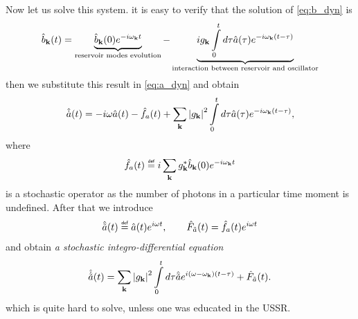 Now let us solve this system. it is easy to verify that the solution of  \eqref{eq:b_dyn}  is
\begin{equation}
	\hat{b}_{\mathbf{k}}(t) = \underbrace{\hat{b}_{\mathbf{k}}(0) e^{-i\omega_{\mathbf{k}} t}}_{\text{reservoir modes evolution}} - \underbrace{i g_{\mathbf{k}} \int \limits_0^{t} d\tau \hat{a}(\tau) e^{-i\omega_{\mathbf{k}}(t - \tau)}}_{\text{interaction between reservoir and oscillator}}
\end{equation}
then we substitute this result in \eqref{eq:a_dyn} and obtain
\begin{equation}
	\hat{\dot{a}}(t) = - i \omega \hat{a}(t) - \hat{f}_a(t) + \sum_{\mathbf{k}} \left| g_{\mathbf{k}} \right|^2 \int \limits_0^td\tau \hat{a}(\tau) e^{-i\omega_{\mathbf{k}}(t - \tau)},
\end{equation}
where
\begin{equation}
	\hat{f}_a(t) \myeq i \sum_{\kv} g_{\kv}^* \hat{b}_{\kv}(0) e^{-i\omega_{\kv} t}
\end{equation}
is a stochastic operator as the number of photons in a particular time moment is undefined. After that we introduce 
\begin{equation}
	\hat{\tilde{a}}(t) \myeq \hat{a}(t) e^{i \omega t}, \qquad \hat{F}_{\tilde{a}} (t) = \hat{f}_a(t) e^{i \omega t}
\end{equation}
and obtain \textit{a stochastic integro-differential equation} 
\begin{equation}
	\hat{\dot{\tilde{a}}}(t) = \sum_{\mathbf{k}} \left| g_{\mathbf{k}} \right|^2 \int \limits_0^t d\tau \hat{\tilde{a}} e^{i(\omega-\omega_{\mathbf{k}})(t - \tau)} + \hat{F}_{\tilde{a}} (t).
	\label{eq:st_int_dif}
\end{equation}
which is quite hard to solve, unless one was educated in the USSR.

